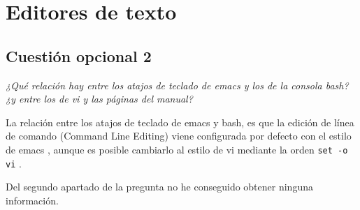 \section{Editores de texto}
\subsection{Cuestión opcional 2}
\textit{¿Qué relación hay entre los atajos de teclado de emacs y los de la consola bash? ¿y entre los de vi y las páginas del manual?}\newline

 La relación entre los atajos de teclado de emacs y bash, es que la edición de línea de comando (Command Line Editing) viene configurada por defecto con el estilo de emacs \cite{bash1}, aunque es posible cambiarlo al estilo de vi mediante la orden \texttt{set -o vi} \cite{bash2}.

Del segundo apartado de la pregunta no he conseguido obtener ninguna información.






\newpage




